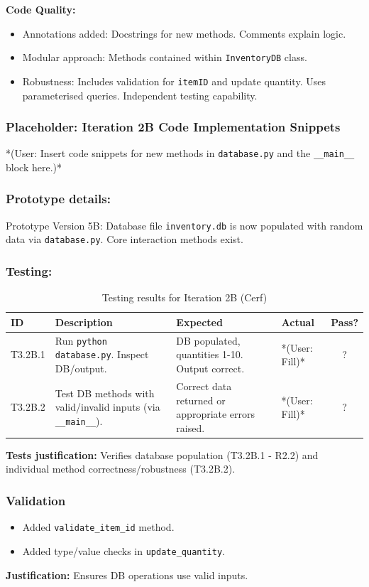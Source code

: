 \textbf{Code Quality:}
\begin{itemize}
	\item Annotations added: Docstrings for new methods. Comments explain logic.
	\item Modular approach: Methods contained within \verb|InventoryDB| class.
	\item Robustness: Includes validation for \verb|itemID| and update quantity. Uses parameterised queries. Independent testing capability.
\end{itemize}

\newpage
\subsubsection*{Placeholder: Iteration 2B Code Implementation Snippets}
*(User: Insert code snippets for new methods in \verb|database.py| and the \verb|__main__| block here.)*
\newpage

\subsubsection{Prototype details:}
Prototype Version 5B: Database file \verb|inventory.db| is now populated with random data via \verb|database.py|. Core interaction methods exist.

\subsubsection{Testing:}
\begin{table}[htbp]
	\centering
	\begin{tabularx}{\textwidth}{|l|X|p{4.5cm}|p{1.5cm}|c|}
		\hline
		\textbf{ID} & \textbf{Description} & \textbf{Expected} & \textbf{Actual} & \textbf{Pass?} \\
		\hline
		T3.2B.1 & Run \verb|python database.py|. Inspect DB/output. & DB populated, quantities 1-10. Output correct. & *(User: Fill)* & ? \\
		\hline
		T3.2B.2 & Test DB methods with valid/invalid inputs (via \verb|__main__|). & Correct data returned or appropriate errors raised. & *(User: Fill)* & ? \\
		\hline
	\end{tabularx}
	\caption{Testing results for Iteration 2B (Cerf)}
\end{table}
\textbf{Tests justification:} Verifies database population (T3.2B.1 - R2.2) and individual method correctness/robustness (T3.2B.2).

\subsubsection{Validation}
\begin{itemize}
	\item Added \verb|validate_item_id| method.
	\item Added type/value checks in \verb|update_quantity|.
\end{itemize}
\textbf{Justification:} Ensures DB operations use valid inputs.

